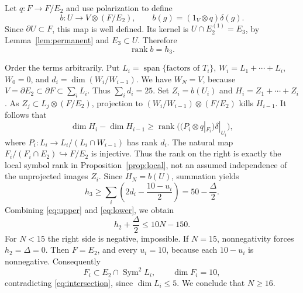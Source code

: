 \documentclass[11pt]{amsart}
\theoremstyle{remark}
\numberwithin{equation}{section}
\newcommand{\Sym}{\operatorname{Sym}}
\newcommand{\Span}{\operatorname{span}}
\newcommand{\rank}{\operatorname{rank}}
\newcommand{\dd}{\partial}
\begin{document}
Let \(q:F\to F/E_2\) and use polarization to define
\[
 b:U\longrightarrow V\otimes(F/E_2),\qquad b(g)=(1_V\otimes q)\delta(g).
\]
Since \(\dd U\subset F\), this map is well defined. Its kernel is
\(U\cap E_2^{(1)}=E_3\), by Lemma~\ref{lem:permanent} and
\(E_3\subset U\). Therefore
\begin{equation}\label{eq:image-h3}
 \rank b=h_3.
\end{equation}

Order the terms arbitrarily. Put
\(L_i=\Span\{\text{factors of }T_i\}\),
\(W_i=L_1+\cdots+L_i\), \(W_0=0\), and
\(d_i=\dim(W_i/W_{i-1})\). We have \(W_N=V\), because
\(V=\dd E_2\subset\dd F\subset\sum_iL_i\). Thus \(\sum_i d_i=25\).
Set \(Z_i=b(U_i)\) and \(H_i=Z_1+\cdots+Z_i\).
As \(Z_j\subset L_j\otimes(F/E_2)\), projection to
\((W_i/W_{i-1})\otimes(F/E_2)\) kills \(H_{i-1}\). It follows that
\[
 \dim H_i-\dim H_{i-1}\ge
 \rank\bigl((P_i\otimes q|_{F_i})\delta|_{U_i}\bigr),
\]
where \(P_i:L_i\to L_i/(L_i\cap W_{i-1})\) has rank \(d_i\).
The natural map \(F_i/(F_i\cap E_2)\hookrightarrow F/E_2\) is
injective. Thus the rank on the right is exactly the local symbol rank
in Proposition~\ref{prop:local}, not an assumed independence of the
unprojected images \(Z_i\). Since \(H_N=b(U)\), summation yields
\begin{equation}\label{eq:lower}
 h_3\ge\sum_i\left(2d_i-\frac{10-u_i}{2}\right)
      =50-\frac{\Delta}{2}.
\end{equation}
Combining \eqref{eq:upper} and \eqref{eq:lower}, we obtain
\begin{equation}\label{eq:terminal}
 \boxed{h_2+\frac{\Delta}{2}\le10N-150.}
\end{equation}
For \(N<15\) the right side is negative, impossible. If \(N=15\),
nonnegativity forces \(h_2=\Delta=0\). Then \(F=E_2\), and every
\(u_i=10\), because each \(10-u_i\) is nonnegative. Consequently
\[
 F_i\subset E_2\cap\Sym^2L_i,\qquad \dim F_i=10,
\]
contradicting \eqref{eq:intersection}, since \(\dim L_i\le5\).
We conclude that \(N\ge16\).
\end{document}
